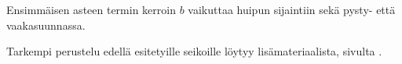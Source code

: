 %	

\begin{center}
\end{center}

Ensimmäisen asteen termin kerroin $b$ vaikuttaa huipun sijaintiin sekä pysty- että vaakasuunnassa.

\begin{center}
\end{center}

Tarkempi perustelu edellä esitetyille seikoille löytyy lisämateriaalista, sivulta \pageref{paraabeli_tod}.



%
%	
%
